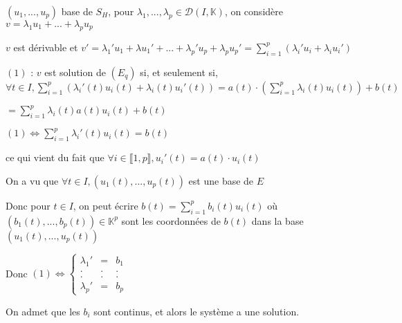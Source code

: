 \documentclass[a4paper,12pt]{book}
\newcommand{\Pre}[1]{\begin{tcolorbox}[sharp corners, colback=white,colframe=green!60!green!30!black!75, title=Preuve]#1\end{tcolorbox}}
\def\K{\mathbb{K}}
\begin{document}
\Pre{$(u_1,...,u_p)$ base de $S_H$, pour $\lambda_1,...,\lambda_p\in\mathcal{D}(I,\K)$, on considère $v = \lambda_1u_1+...+\lambda_pu_p$
\par $v$ est dérivable et $v' =\lambda_1'u_1 + \lambda u_1' + ...+\lambda_p'u_p + \lambda_pu_p'  = \sum\limits_{i=1}^p(\lambda_i'u_i +\lambda_iu_i')$
\par $(1)$ : $v$ est solution de $(E_q)$ si, et seulement si, $\forall t\in I, \sum\limits_{i=1}^p (\lambda_i'(t)u_i(t) + \lambda_i(t)u_i'(t)) = a(t)\cdot \left(\sum\limits_{i=1}^p \lambda_i(t)u_i(t)\right) + b(t)$
\par $= \sum\limits_{i=1}^p\lambda_i(t)a(t)u_i(t)+b(t)$
\par $(1)\Leftrightarrow \sum\limits_{i=1}^p\lambda_i'(t)u_i(t) = b(t)$
\par ce qui vient du fait que $\forall i\in\llbracket 1,p\rrbracket, u_i'(t) = a(t)\cdot u_i(t)$
\par On a vu que $\forall t\in I, (u_1(t),...,u_p(t))$ est une base de $E$
\par Donc pour $t\in I$, on peut écrire $b(t) = \sum\limits_{i=1}^pb_i(t)u_i(t)$ où $(b_1(t),..., b_p(t))\in\K^p$ sont les coordonnées de $b(t)$ dans la base $(u_1(t),..., u_p(t))$
\par Donc $(1) \Leftrightarrow \left\{\begin{array}{rcl} \lambda_1' & = & b_1 \\ . & . & . \\ . & . & . \\ \lambda_p' & = & b_p\end{array}\right.$
\par On admet que les $b_i$ sont continus, et alors le système a une solution.}
\end{document}
